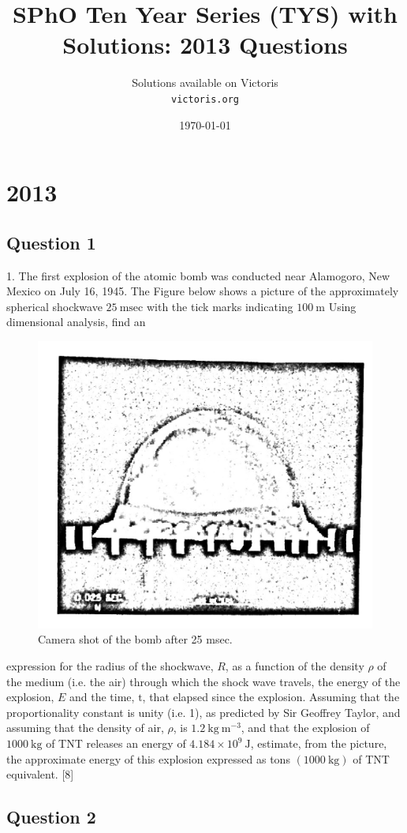 \documentclass{article}
\title{SPhO Ten Year Series (TYS) with Solutions: 2013 Questions}
\author{
    Solutions available on Victoris\\
    \texttt{victoris.org}
}
\date{\today}
\begin{document}
\maketitle


\section{2013}

\subsection{Question 1}
1. The first explosion of the atomic bomb was conducted near Alamogoro, New Mexico on July 16, 1945. The Figure below shows a picture of the approximately spherical shockwave $25 \mathrm{~msec}$ with the tick marks indicating $100 \mathrm{~m}$ Using dimensional analysis, find an

\begin{figure}
	\centering
	\includegraphics[width=0.5\linewidth]{spho_book_TYS_images/2013q1.png}
	\caption{Camera shot of the bomb after 25 msec.}
\end{figure}

expression for the radius of the shockwave, $R$, as a function of the density $\rho$ of the medium (i.e. the air) through which the shock wave travels, the energy of the explosion, $E$ and the time, $\mathrm{t}$, that elapsed since the explosion.
Assuming that the proportionality constant is unity (i.e. 1), as predicted by Sir Geoffrey Taylor, and assuming that the density of air, $\rho$, is $1.2 \mathrm{~kg} \mathrm{~m}^{-3}$, and that the explosion of $1000 \mathrm{~kg}$ of TNT releases an energy of $4.184 \times 10^{9} \mathrm{~J}$, estimate, from the picture, the approximate energy of this explosion expressed as tons $(1000 \mathrm{~kg})$ of TNT equivalent. [8]

\subsection{Question 2}
\end{document}
